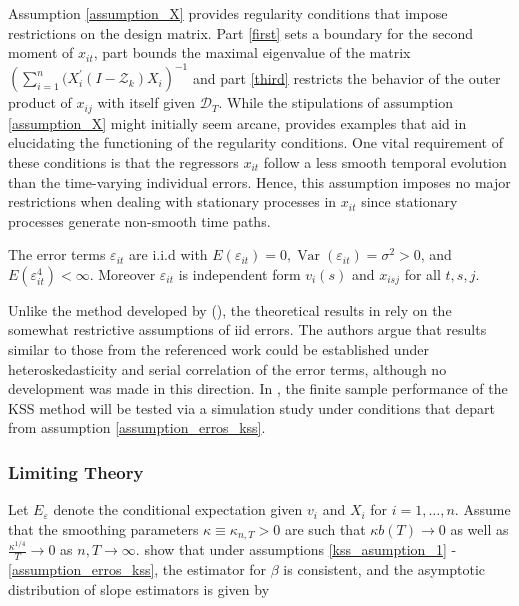 Assumption \ref{assumption_X} provides regularity conditions that impose restrictions on the design matrix. Part \ref{first} sets a boundary for the second moment of $x_{it}$, part \label{second} bounds the maximal eigenvalue of the matrix $\left( \sum_{i=1}^n ( X_i ^\prime (I - \mathcal{Z}_k) X_i \right)^{-1}$ and part \ref{third} restricts the behavior of the outer product of $x_{ij}$ with itself given $\mathcal{D}_T$. While the stipulations of assumption \ref{assumption_X} might initially seem arcane, \citet{kneip2012new} provides examples that aid in elucidating the functioning of the regularity conditions. One vital requirement of these conditions is that the regressors \(x_{it}\) follow a less smooth temporal evolution than the time-varying individual errors. Hence, this assumption imposes no major restrictions when dealing with stationary processes in $x_{it}$ since stationary processes generate non-smooth time paths. 


    \begin{assumption}\label{assumption_erros_kss}
        The error terms $\varepsilon_{it}$ are i.i.d with $E(\varepsilon_{it}) = 0, \operatorname{Var}(\varepsilon_{it}) = \sigma ^2 > 0$, and $E(\varepsilon_{it}^4) < \infty$. Moreover $\varepsilon_{it}$ is independent form $v_i(s)$ and $x_{isj}$ for all $t,s,j$.
    \end{assumption}

Unlike the method developed by \citet{bai2002determining} (), the theoretical results in \citet{kneip2012new} rely on the somewhat restrictive assumptions of \ac{iid} errors. The authors argue that results similar to those from the referenced work could be established under heteroskedasticity and serial correlation of the error terms, although no development was made in this direction. In , the finite sample performance of the \ac{KSS} method will be tested via a simulation study under conditions that depart from assumption \ref{assumption_erros_kss}.

\subsubsection{Limiting Theory}

Let $E_{\varepsilon}$ denote the conditional expectation given $v_i$ and $X_i$ for $i = 1, \ldots, n$. Assume that the smoothing parameters $\kappa \equiv \kappa_{n,T} >0$ are such that $\kappa b(T) \to 0$ as well as $\frac{\kappa^{1/4}}{T} \to 0$ as $n,T \to \infty$. \citet{kneip2012new} show that under assumptions \ref{kss_asumption_1} - \ref{assumption_erros_kss}, the estimator for $\beta$ is consistent, and  the asymptotic distribution of slope estimators is given by 

